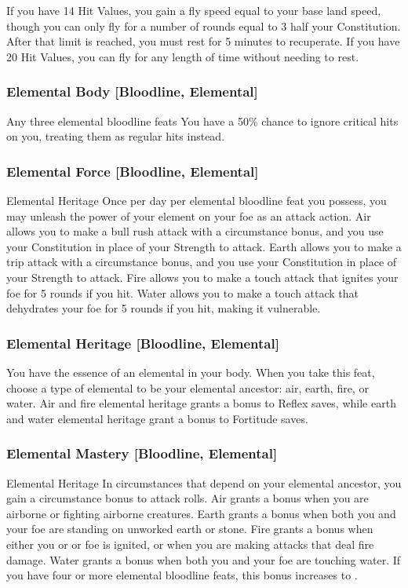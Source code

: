 If you have 14 Hit Values, you gain a fly speed equal to your base land speed, though you can only fly for a number of rounds equal to 3 \add half your Constitution. After that limit is reached, you must rest for 5 minutes to recuperate. If you have 20 Hit Values, you can fly for any length of time without needing to rest.

\subsubsection{Elemental Body [Bloodline, Elemental]}
\featpre Any three elemental bloodline feats
\featben You have a 50\% chance to ignore critical hits on you, treating them as regular hits instead.

\subsubsection{Elemental Force [Bloodline, Elemental]}
\featpre Elemental Heritage
\featben Once per day per elemental bloodline feat you possess, you may unleash the power of your element on your foe as an attack action. Air allows you to make a bull rush attack with a  circumstance bonus, and you use your Constitution in place of your Strength to attack. Earth allows you to make a trip attack with a  circumstance bonus, and you use your Constitution in place of your Strength to attack. Fire allows you to make a touch attack that ignites your foe for 5 rounds if you hit. Water allows you to make a touch attack that dehydrates your foe for 5 rounds if you hit, making it vulnerable.

\subsubsection{Elemental Heritage [Bloodline, Elemental]}
\featben You have the essence of an elemental in your body. When you take this feat, choose a type of elemental to be your elemental ancestor: air, earth, fire, or water. Air and fire elemental heritage grants a  bonus to Reflex saves, while earth and water elemental heritage grant a  bonus to Fortitude saves.

\subsubsection{Elemental Mastery [Bloodline, Elemental]}
\featpre Elemental Heritage
\featben In circumstances that depend on your elemental ancestor, you gain a  circumstance bonus to attack rolls. Air grants a bonus when you are airborne or fighting airborne creatures. Earth grants a bonus when both you and your foe are standing on unworked earth or stone. Fire grants a bonus when either you or or foe is ignited, or when you are making attacks that deal fire damage. Water grants a bonus when both you and your foe are touching water. If you have four or more elemental bloodline feats, this bonus increases to .

